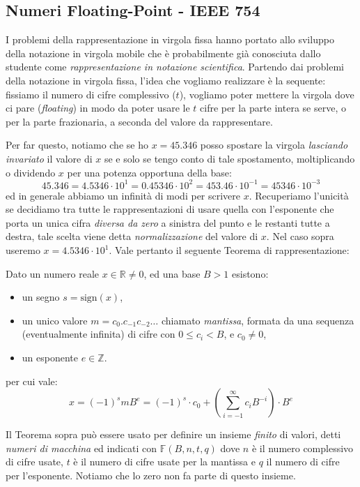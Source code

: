 \subsection{Numeri Floating-Point - IEEE 754}

I problemi della rappresentazione in virgola fissa hanno portato allo sviluppo
della notazione in virgola mobile che è probabilmente già conosciuta dallo
studente come \emph{rappresentazione in notazione scientifica}. Partendo dai
problemi della notazione in virgola fissa, l'idea che vogliamo realizzare è la
sequente: fissiamo il numero di cifre complessivo ($t$), vogliamo
poter mettere la virgola dove ci pare (\emph{floating}) in modo da poter
usare le $t$ cifre per la parte intera se serve, o per la parte frazionaria, a seconda del valore da rappresentare. 

Per far questo, notiamo che se ho $x = 45.346$ posso
spostare la virgola \emph{lasciando invariato} il valore di $x$ se e solo se
tengo conto di tale spostamento, moltiplicando o dividendo $x$ per una potenza
opportuna della base: \[ 45.346 = 4.5346\cdot{10^1} = 0.45346\cdot{10^2} =
453.46\cdot 10^{-1} = 45346\cdot 10^{-3}\]
ed in generale abbiamo un infinità di modi per scrivere $x$. Recuperiamo
l'unicità se decidiamo tra tutte le rappresentazioni di usare quella con
l'esponente che porta un unica cifra \emph{diversa da zero} a sinistra del
punto e le restanti tutte a destra, tale scelta viene detta
\emph{normalizzazione} del valore di $x$. Nel caso sopra useremo $x =
4.5346\cdot{10^1}$. Vale pertanto il seguente Teorema di rappresentazione:

\begin{thm}
\medskip
Dato un numero reale $x \in \mathbb{R} \neq 0$, ed una base $B>1$ esistono:
 \begin{itemize}
	 \item un segno $s = \text{sign}(x)$,
	 \item un unico valore $m = c_0.c_{-1}c_{-2}\ldots$ chiamato \emph{mantissa}, formata da una sequenza (eventualmente infinita) di cifre con $0 \leq c_i < B$, e $c_0 \neq 0$,      \item un esponente $e \in \mathbb{Z}$.
 \end{itemize} per cui vale:
\[ x = (-1)^s m B^e = (-1)^s \cdot c_0 + \left(\sum_{i=-1}^{\infty} c_iB^{-i} \right)\cdot B^e \]
\end{thm}

Il Teorema sopra può essere usato per definire un insieme \emph{finito} di valori, detti \emph{numeri di macchina} ed indicati con $\mathbb{F}(B,n,t,q)$ dove $n$ è il numero complessivo di cifre usate, $t$ è il numero di cifre usate per la mantissa e $q$ il numero di cifre per l'esponente. Notiamo che lo zero non fa parte di questo insieme.

